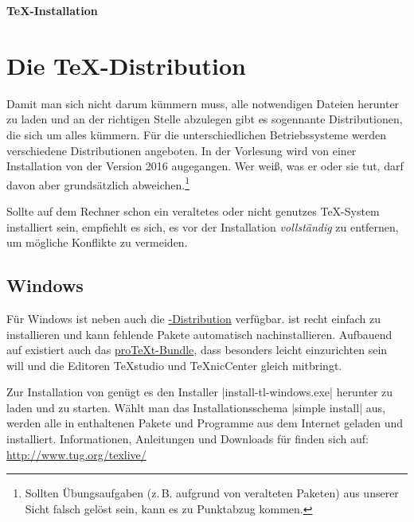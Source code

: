 \documentclass[
	datum=2016-10-17,
	titel=Installationshinweise,
]{../tex/latexkurs-exercise}
\begin{document}
\begin{center}
\sffamily\bfseries\Large \TeX-Installation
\end{center}
\begin{abstract}
\noindent
Diese Anleitung erklärt ganz grundlegend, wie man eine aktuelle \TeXlive-\linebreak Distribution Installiert, die für den \LaTeX-Kurs vorausgesetzt wird.
Ein funktionierendes \TeX-System besteht im Grundsatz aus zwei Teilen: einer \TeX-Distribution und einem 
Editor.
\end{abstract}

\section{Die \TeX-Distribution}
Damit man sich nicht darum kümmern muss, alle notwendigen Dateien herunter zu laden und an der richtigen Stelle abzulegen gibt es sogennante Distributionen, die sich um alles kümmern. Für die unterschiedlichen Betriebssysteme werden verschiedene Distributionen angeboten. In der Vorlesung wird von einer Installation von \href{http://www.tug.org/texlive/}{\TeXlive} der Version 2016 augegangen. Wer weiß, was er oder sie tut, darf davon aber grundsätzlich abweichen.\footnote{Sollten Übungsaufgaben (z.\,B. aufgrund von veralteten Paketen) aus unserer Sicht falsch gelöst sein, kann es zu Punktabzug kommen.}

Sollte auf dem Rechner schon ein veraltetes oder nicht genutzes \TeX-System installiert sein, empfiehlt es sich, es vor der Installation \emph{vollständig} zu entfernen, um mögliche Konflikte zu vermeiden.

\subsection*{Windows}
Für Windows ist neben \href{http://www.tug.org/texlive/}{\TeXlive} auch die \href{http://www.miktex.org/}{\MikTeX-Distribution} verfügbar. \MikTeX ist recht einfach zu installieren und kann fehlende Pakete automatisch nachinstallieren. Aufbauend auf \MikTeX existiert auch das \href{http://www.tug.org/protext/}{pro\TeX t-Bundle}, dass besonders leicht einzurichten sein will und die Editoren \TeX studio und \TeX nicCenter gleich mitbringt.

Zur Installation von \TeXlive genügt es den Installer |install-tl-windows.exe| herunter zu laden und zu starten. Wählt man das Installationsschema |simple install| aus, werden alle in \TeXlive enthaltenen Pakete und Programme aus dem Internet geladen und installiert. Informationen, Anleitungen und Downloads für \TeXlive finden sich auf:\\ \url{http://www.tug.org/texlive/}
\end{document}
